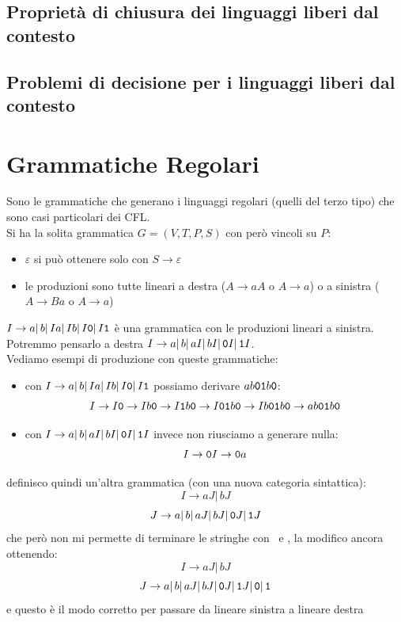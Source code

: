 \subsection{Proprietà di chiusura dei linguaggi liberi dal contesto}\label{sec:chiusura-cfl}

\subsection{Problemi di decisione per i linguaggi liberi dal contesto}\label{sec:decisioni-cfl}


\section{Grammatiche Regolari}
Sono le grammatiche che generano i linguaggi regolari (quelli del terzo tipo) che sono casi particolari dei CFL.\\
Si ha la solita grammatica $G = (V, T, P, S)$ con però vincoli su $P$:
\begin{itemize}
	\item $\varepsilon$ si può ottenere solo con $S\to \varepsilon$
	\item le produzioni sono tutte lineari a destra ($A\to aA$ o $A\to a$) o a sinistra ($A\to Ba$ o $A\to a$)
\end{itemize}
\begin{example}
	$I\to a|\,b|\,Ia|\,Ib|\,I\mathtt{0}|\,I\mathtt{1}$ è una grammatica con le produzioni lineari a sinistra.\\
	Potremmo pensarlo a destra $I\to a|\,b|\,aI|\,bI|\,\mathtt{0} I|\,\mathtt{1} I$.\\
	Vediamo esempi di produzione con queste grammatiche:
	\begin{itemize}
		\item con $I\to a|\,b|\,Ia|\,Ib|\,I\mathtt{0}|\,I\mathtt{1}$ possiamo derivare $ab\mathtt{0}\mathtt{1} b\mathtt{0}$:
		      $$I\to I\mathtt{0}\to Ib\mathtt{0}\to I\mathtt{1} b\mathtt{0}\to I\mathtt{0}\mathtt{1} b\mathtt{0}\to Ib\mathtt{0}\mathtt{1} b\mathtt{0}\to ab\mathtt{0}\mathtt{1} b\mathtt{0}$$
		\item con $I\to a|\,b|\,aI|\,bI|\,\mathtt{0} I|\,\mathtt{1} I$ invece non riusciamo a generare nulla:
		      $$I\to \mathtt{0} I\to \mathtt{0} a$$
	\end{itemize}
	definisco quindi un'altra grammatica (con una nuova categoria sintattica):
	$$I\to aJ|\, bJ$$
	$$J\to a|\,b|\,aJ|\,bJ|\,\mathtt{0} J|\,\mathtt{1} J$$
	che però non mi permette di terminare le stringhe con \zero\ e \uno, la modifico ancora ottenendo:
	$$I\to aJ|\, bJ$$
	$$J\to a|\,b|\,aJ|\,bJ|\,\mathtt{0} J|\,\mathtt{1} J|\,\mathtt{0}|\,\mathtt{1}$$
	e questo è il modo corretto per passare da lineare sinistra a lineare destra
\end{example}
